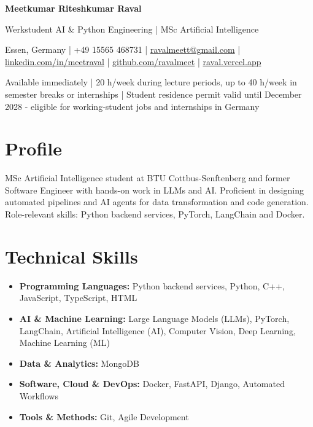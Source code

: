 \documentclass[a4paper,10pt]{article}
\begin{document}
\begin{center}
  {\LARGE\bfseries Meetkumar Riteshkumar Raval}\par\vspace{3pt}
  {\large Werkstudent AI \& Python Engineering | MSc Artificial Intelligence}\par\vspace{3pt}
  {\small Essen, Germany | +49 15565 468731 | \href{mailto:ravalmeett@gmail.com}{ravalmeett@gmail.com} | \href{https://www.linkedin.com/in/meetraval/}{linkedin.com/in/meetraval} | \href{https://github.com/ravalmeet}{github.com/ravalmeet} | \href{https://raval.vercel.app/}{raval.vercel.app}}\par\vspace{2pt}
  {\small Available immediately | 20 h/week during lecture periods, up to 40 h/week in semester breaks or internships | Student residence permit valid until December 2028 - eligible for working-student jobs and internships in Germany}\par
\end{center}

\section*{Profile}
MSc Artificial Intelligence student at BTU Cottbus-Senftenberg and former Software Engineer with hands-on work in LLMs and AI. Proficient in designing automated pipelines and AI agents for data transformation and code generation. Role-relevant skills: Python backend services, PyTorch, LangChain and Docker.\par

\section*{Technical Skills}
\begin{itemize}
\item \textbf{Programming Languages:} Python backend services, Python, C++, JavaScript, TypeScript, HTML
\item \textbf{AI \& Machine Learning:} Large Language Models (LLMs), PyTorch, LangChain, Artificial Intelligence (AI), Computer Vision, Deep Learning, Machine Learning (ML)
\item \textbf{Data \& Analytics:} MongoDB
\item \textbf{Software, Cloud \& DevOps:} Docker, FastAPI, Django, Automated Workflows
\item \textbf{Tools \& Methods:} Git, Agile Development
\end{itemize}
\end{document}
